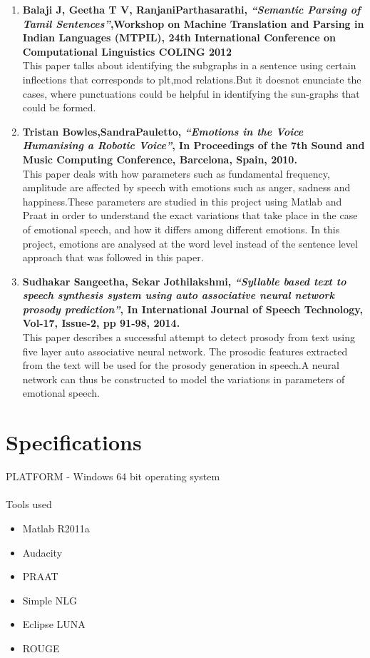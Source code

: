 \documentclass{article}
\begin{document}
\begin{enumerate}
\item \textbf{Balaji J, Geetha T V, RanjaniParthasarathi, \textit{“Semantic Parsing of Tamil Sentences”},Workshop on Machine Translation and Parsing in Indian Languages (MTPIL), 24th International Conference on Computational Linguistics COLING 2012}
\\This paper talks about identifying the subgraphs in a sentence using certain inflections that corresponds to plt,mod relations.But it doesnot enunciate the cases, where punctuations could be helpful in identifying the sun-graphs that could be formed.

\item  \textbf{Tristan Bowles,SandraPauletto,  \textit{“Emotions in the Voice Humanising a Robotic Voice”}, In Proceedings of the 7th Sound and Music Computing Conference, Barcelona, Spain, 2010.}
\\This paper deals with how parameters such as fundamental frequency, amplitude are affected by speech with emotions such as anger, sadness and happiness.These parameters are studied in this project using Matlab and Praat in order to understand the exact variations that take place in the case of emotional speech, and how it differs among different emotions. In this project, emotions are analysed at the word level instead of the sentence level approach that was followed in this paper.


\item \textbf{Sudhakar Sangeetha, Sekar Jothilakshmi,  \textit{“Syllable based  text to speech synthesis system using auto associative neural network prosody prediction”}, In International Journal of Speech Technology, Vol-17, Issue-2, pp 91-98, 2014.}
\\This paper describes a successful attempt to detect prosody from text using five layer auto associative neural network. The prosodic features extracted from the text will be used for the prosody generation in speech.A neural network can thus be constructed to model the variations in parameters of emotional speech. 
\end{enumerate}

\section{Specifications} \large
PLATFORM - Windows 64 bit operating system\\
\\Tools used
\begin{itemize}
\item Matlab R2011a
\item Audacity
\item PRAAT
\item Simple NLG
\item Eclipse LUNA
\item ROUGE
\end{itemize}
\end{document}
